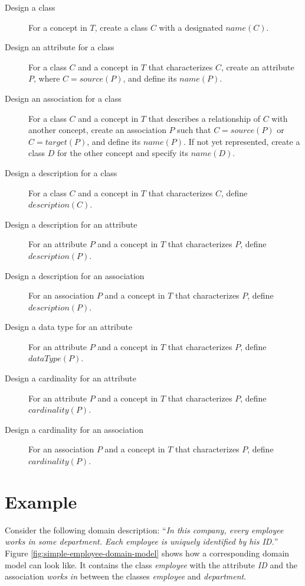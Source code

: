 \begin{description}
\item [Design a class] For a concept in $T$, create a class $C$ with a designated $name(C)$.

\item[Design an attribute for a class] For a class $C$ and a concept in $T$ that characterizes $C$, create an attribute $P$, where $C = source(P)$, and define its $name(P)$.

\item[Design an association for a class] For a class $C$ and a concept in $T$ that describes a relationship of $C$ with another concept, create an association $P$ such that $C = source(P)$ or $C = target(P)$, and define its $name(P)$. If not yet represented, create a class $D$ for the other concept and specify its $name(D)$.

\item [Design a description for a class] For a class $C$ and a concept in $T$ that characterizes $C$, define $description(C)$.

\item [Design a description for an attribute] For an attribute $P$ and a concept in $T$ that characterizes $P$, define $description(P)$.

\item [Design a description for an association] For an association $P$ and a concept in $T$ that characterizes $P$, define $description(P)$.

\item [Design a data type for an attribute] For an attribute $P$ and a concept in $T$ that characterizes $P$, define $dataType(P)$.

\item [Design a cardinality for an attribute] For an attribute $P$ and a concept in $T$ that characterizes $P$, define $cardinality(P)$.

\item [Design a cardinality for an association] For an association $P$ and a concept in $T$ that characterizes $P$, define $cardinality(P)$.
\end{description}


\section{Example}
\label{sec:simple_domain_description_example}

Consider the following domain description: ``\textit{In this company, every employee works in some department. Each employee is uniquely identified by his ID.}'' Figure \ref{fig:simple-employee-domain-model} shows how a corresponding domain model can look like. It contains the class \textit{employee} with the attribute \textit{ID} and the association \textit{works in} between the classes \textit{employee} and \textit{department}.

